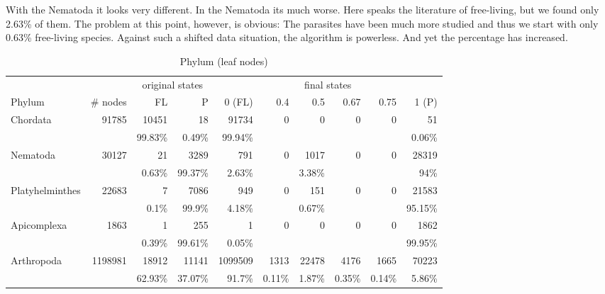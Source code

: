       With the Nematoda it looks very different.  In the Nematoda its much worse. Here speaks the 
        literature of  free-living, but we found only 2.63\% of them. The problem at 
        this point, however, is obvious: The parasites have been much more studied and thus we start 
        with only 0.63\% free-living species. Against such a shifted data situation, the algorithm is 
        powerless. And yet the percentage has increased.

      \begin{table}
        \begin{center}
          \hspace*{-1cm}\begin{tabular}{ |l|r||r|r||r|r|r|r|r|r| }
            \hline
            & & \multicolumn{2}{c||}{original states} & \multicolumn{6}{c|}{final states} \\
            Phylum & \# nodes & FL & P
              & 0 (FL) & 0.4 & 0.5 & 0.67 & 0.75 & 1 (P) \\
            \hline \hline
            Chordata & 91785 & 10451 & 18 
              & 91734 & 0 & 0 & 0 & 0 & 51 \\
            & & 99.83\% & 0.49\%
              & 99.94\% & & & & & 0.06\% \\ \hline
            Nematoda & 30127 & 21 & 3289 
              & 791 & 0 & 1017 & 0 & 0 & 28319 \\
            & & 0.63\% & 99.37\%
              & 2.63\% & & 3.38\% & & & 94\% \\ \hline
            Platyhelminthes & 22683 & 7 & 7086 
              & 949 & 0 & 151 & 0 & 0 & 21583 \\
            & & 0.1\% & 99.9\%
              & 4.18\% & & 0.67\% & & & 95.15\% \\ \hline
            Apicomplexa & 1863 & 1 & 255 
              & 1 & 0 & 0 & 0 & 0 & 1862 \\
            & & 0.39\% & 99.61\%
              & 0.05\% & & & & & 99.95\% \\
            \hline \hline
            Arthropoda & 1198981 & 18912 & 11141 
              & 1099509 & 1313 & 22478 & 4176 & 1665 & 70223 \\
            & & 62.93\% & 37.07\%
              & 91.7\% & 0.11\% & 1.87\% & 0.35\% & 0.14\% & 5.86\% \\
            \hline
          \end{tabular} 
        \end{center}
        \caption{Phylum (leaf nodes)}
        \label{table:phylum leaf nodes states} 
      \end{table}

